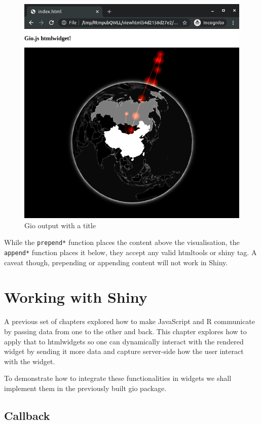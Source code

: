 \documentclass[
]{krantz}
\begin{document}
\begin{figure}
\centering
\includegraphics{images/gio-title.png}
\caption{Gio output with a title}
\end{figure}

While the \texttt{prepend*} function places the content above the visualisation, the \texttt{append*} function places it below, they accept any valid htmltools or shiny tag. A caveat though, prepending or appending content will not work in Shiny.

\hypertarget{working-with-shiny}{%
\chapter{Working with Shiny}\label{working-with-shiny}}

A previous set of chapters explored how to make JavaScript and R communicate by passing data from one to the other and back. This chapter explores how to apply that to htmlwidgets so one can dynamically interact with the rendered widget by sending it more data and capture server-side how the user interact with the widget.

To demonstrate how to integrate these functionalities in widgets we shall implement them in the previously built gio package.

\hypertarget{callback}{%
\section*{Callback}\label{callback}}
\end{document}
